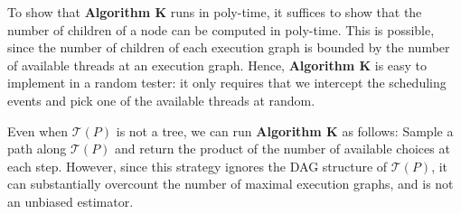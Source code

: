 \documentclass[acmsmall]{acmart}
\begin{document}
\begin{tcolorbox}[
    colback=SkyBlue!5,
    colframe=blue!20,
    boxrule=1pt,
    arc=2pt,
    width=\textwidth,
    breakable
]










\end{tcolorbox}



To show that \textbf{Algorithm K} runs in poly-time, it suffices to show that the number of children of a node can be computed in poly-time. This is possible, since  the number of children of each execution graph is bounded by the number of available threads at an execution graph.
Hence, \textbf{Algorithm K} is easy to implement in a random tester: it only requires that we intercept the scheduling events 
and pick one of the available threads at random. 

Even when $\mathcal{T}(P)$ is not a tree, we can run \textbf{Algorithm K} as follows: Sample a path along $\mathcal{T}(P)$ and return the product of the number of available choices at each step. 
However, since this strategy ignores the 
DAG structure of $\mathcal{T}(P)$, it can substantially overcount the number of maximal execution graphs, and is not an unbiased estimator.
\end{document}
